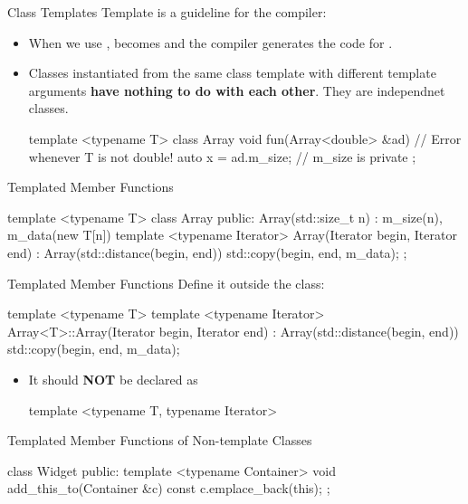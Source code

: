 \begin{frame}[fragile]{Class Templates}
    Template is a guideline for the compiler:
    \begin{itemize}
        \item When we use ,  becomes  and the compiler generates the code for .
        \item Classes instantiated from the same class template with different template arguments \textbf{have nothing to do with each other}. They are independnet classes.
        \begin{cpp}
template <typename T>
class Array {
  void fun(Array<double> &ad) {
    // Error whenever T is not double!
    auto x = ad.m_size; // m_size is private
  }
};
        \end{cpp}
    \end{itemize}
\end{frame}

\begin{frame}[fragile]{Templated Member Functions}
    \begin{cpp}
template <typename T>
class Array {
 public:
  Array(std::size_t n) : m_size(n), m_data(new T[n]{}) {}
  template <typename Iterator>
  Array(Iterator begin, Iterator end)
      : Array(std::distance(begin, end)) {
    std::copy(begin, end, m_data);
  }
};
    \end{cpp}
\end{frame}

\begin{frame}[fragile]{Templated Member Functions}
    Define it outside the class:
    \begin{cpp}
template <typename T>
template <typename Iterator>
Array<T>::Array(Iterator begin, Iterator end)
    : Array(std::distance(begin, end)) {
  std::copy(begin, end, m_data);
}
    \end{cpp}
    \begin{itemize}
        \item It should \textbf{NOT} be declared as
        \begin{cpp}
template <typename T, typename Iterator>
        \end{cpp}
    \end{itemize}
\end{frame}

\begin{frame}[fragile]{Templated Member Functions of Non-template Classes}
    \begin{cpp}
class Widget {
 public:
  template <typename Container>
  void add_this_to(Container &c) const {
    c.emplace_back(this);
  }
};
    \end{cpp}
\end{frame}

